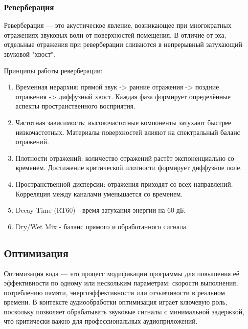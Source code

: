 \subsubsection{Реверберация}

Реверберация — это акустическое явление, возникающее при многократных отражениях звуковых волн от поверхностей помещения. В отличие от эха, отдельные отражения при реверберации сливаются в непрерывный затухающий звуковой "хвост".

Принципы работы реверберации:
\begin{enumerate}
	\item Временная иерархия: прямой звук -> ранние отражения -> поздние отражения -> диффузный хвост. Каждая фаза формирует определённые аспекты пространственного восприятия.
	\item Частотная зависимость: высокочастотные компоненты затухают быстрее низкочастотных. Материалы поверхностей влияют на спектральный баланс отражений.
	\item Плотности отражений: количество отражений растёт экспоненциально со временем. Достижение критической плотности формирует диффузное поле.
	\item Пространственной дисперсии: отражения приходят со всех направлений. Корреляция между каналами уменьшается со временем.
	\item Decay Time (RT60) - время затухания энергии на 60 дБ.
	\item Dry/Wet Mix - баланс прямого и обработанного сигнала.
\end{enumerate}

\subsection{Оптимизация}

Оптимизация кода — это процесс модификации программы для повышения её эффективности по одному или нескольким параметрам: скорости выполнения, потреблению памяти, энергоэффективности или отзывчивости в реальном времени. В контексте аудиообработки оптимизация играет ключевую роль, поскольку позволяет обрабатывать звуковые сигналы с минимальной задержкой, что критически важно для профессиональных аудиоприложений.

